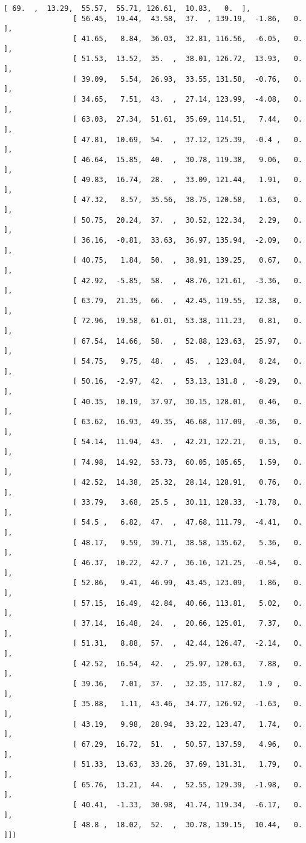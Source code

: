 \documentclass[11pt]{article}
\begin{document}
\begin{Verbatim}[commandchars=\\\{\}]
                [ 69.  ,  13.29,  55.57,  55.71, 126.61,  10.83,   0.  ],
                [ 56.45,  19.44,  43.58,  37.  , 139.19,  -1.86,   0.  ],
                [ 41.65,   8.84,  36.03,  32.81, 116.56,  -6.05,   0.  ],
                [ 51.53,  13.52,  35.  ,  38.01, 126.72,  13.93,   0.  ],
                [ 39.09,   5.54,  26.93,  33.55, 131.58,  -0.76,   0.  ],
                [ 34.65,   7.51,  43.  ,  27.14, 123.99,  -4.08,   0.  ],
                [ 63.03,  27.34,  51.61,  35.69, 114.51,   7.44,   0.  ],
                [ 47.81,  10.69,  54.  ,  37.12, 125.39,  -0.4 ,   0.  ],
                [ 46.64,  15.85,  40.  ,  30.78, 119.38,   9.06,   0.  ],
                [ 49.83,  16.74,  28.  ,  33.09, 121.44,   1.91,   0.  ],
                [ 47.32,   8.57,  35.56,  38.75, 120.58,   1.63,   0.  ],
                [ 50.75,  20.24,  37.  ,  30.52, 122.34,   2.29,   0.  ],
                [ 36.16,  -0.81,  33.63,  36.97, 135.94,  -2.09,   0.  ],
                [ 40.75,   1.84,  50.  ,  38.91, 139.25,   0.67,   0.  ],
                [ 42.92,  -5.85,  58.  ,  48.76, 121.61,  -3.36,   0.  ],
                [ 63.79,  21.35,  66.  ,  42.45, 119.55,  12.38,   0.  ],
                [ 72.96,  19.58,  61.01,  53.38, 111.23,   0.81,   0.  ],
                [ 67.54,  14.66,  58.  ,  52.88, 123.63,  25.97,   0.  ],
                [ 54.75,   9.75,  48.  ,  45.  , 123.04,   8.24,   0.  ],
                [ 50.16,  -2.97,  42.  ,  53.13, 131.8 ,  -8.29,   0.  ],
                [ 40.35,  10.19,  37.97,  30.15, 128.01,   0.46,   0.  ],
                [ 63.62,  16.93,  49.35,  46.68, 117.09,  -0.36,   0.  ],
                [ 54.14,  11.94,  43.  ,  42.21, 122.21,   0.15,   0.  ],
                [ 74.98,  14.92,  53.73,  60.05, 105.65,   1.59,   0.  ],
                [ 42.52,  14.38,  25.32,  28.14, 128.91,   0.76,   0.  ],
                [ 33.79,   3.68,  25.5 ,  30.11, 128.33,  -1.78,   0.  ],
                [ 54.5 ,   6.82,  47.  ,  47.68, 111.79,  -4.41,   0.  ],
                [ 48.17,   9.59,  39.71,  38.58, 135.62,   5.36,   0.  ],
                [ 46.37,  10.22,  42.7 ,  36.16, 121.25,  -0.54,   0.  ],
                [ 52.86,   9.41,  46.99,  43.45, 123.09,   1.86,   0.  ],
                [ 57.15,  16.49,  42.84,  40.66, 113.81,   5.02,   0.  ],
                [ 37.14,  16.48,  24.  ,  20.66, 125.01,   7.37,   0.  ],
                [ 51.31,   8.88,  57.  ,  42.44, 126.47,  -2.14,   0.  ],
                [ 42.52,  16.54,  42.  ,  25.97, 120.63,   7.88,   0.  ],
                [ 39.36,   7.01,  37.  ,  32.35, 117.82,   1.9 ,   0.  ],
                [ 35.88,   1.11,  43.46,  34.77, 126.92,  -1.63,   0.  ],
                [ 43.19,   9.98,  28.94,  33.22, 123.47,   1.74,   0.  ],
                [ 67.29,  16.72,  51.  ,  50.57, 137.59,   4.96,   0.  ],
                [ 51.33,  13.63,  33.26,  37.69, 131.31,   1.79,   0.  ],
                [ 65.76,  13.21,  44.  ,  52.55, 129.39,  -1.98,   0.  ],
                [ 40.41,  -1.33,  30.98,  41.74, 119.34,  -6.17,   0.  ],
                [ 48.8 ,  18.02,  52.  ,  30.78, 139.15,  10.44,   0.  ]])
\end{Verbatim}
            
\end{document}
